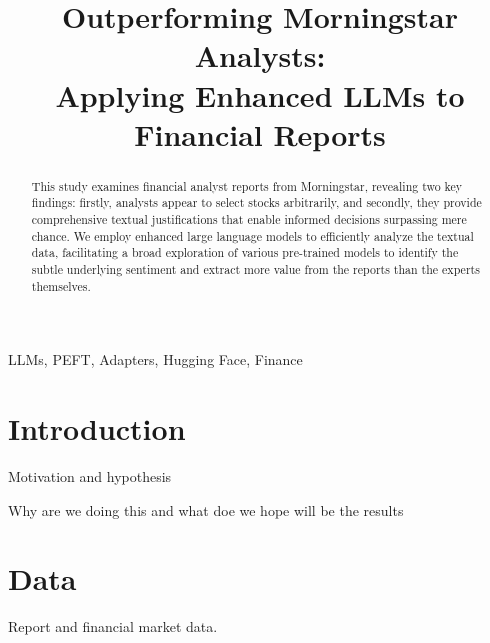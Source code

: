 \documentclass[conference]{IEEEtran}
\begin{document}
\title{Outperforming Morningstar Analysts: \\ Applying Enhanced LLMs to Financial Reports
}

\author{
\and
{}
}

\maketitle

\begin{abstract}
This study examines financial analyst reports from Morningstar, revealing two key findings: firstly, analysts appear to select stocks arbitrarily, and secondly, they provide comprehensive textual justifications that enable informed decisions surpassing mere chance. We employ enhanced large language models to efficiently analyze the textual data, facilitating a broad exploration of various pre-trained models to identify the subtle underlying sentiment and extract more value from the reports than the experts themselves. %
\end{abstract}

\begin{IEEEkeywords}
LLMs, PEFT, Adapters, Hugging Face, Finance
\end{IEEEkeywords}

\section{Introduction}
Motivation and hypothesis \cite{Poth2023,Kokhlikyan2020,Russell2021,Kauermann2021}

Why are we doing this and what doe we hope will be the results
\section{Data} %
Report and financial market data.
\end{document}
